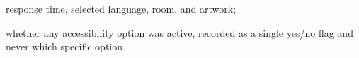 


    \item response time, selected language, room, and artwork;
    \item whether any accessibility option was active, recorded as a single
          yes/no flag and never which specific option.





